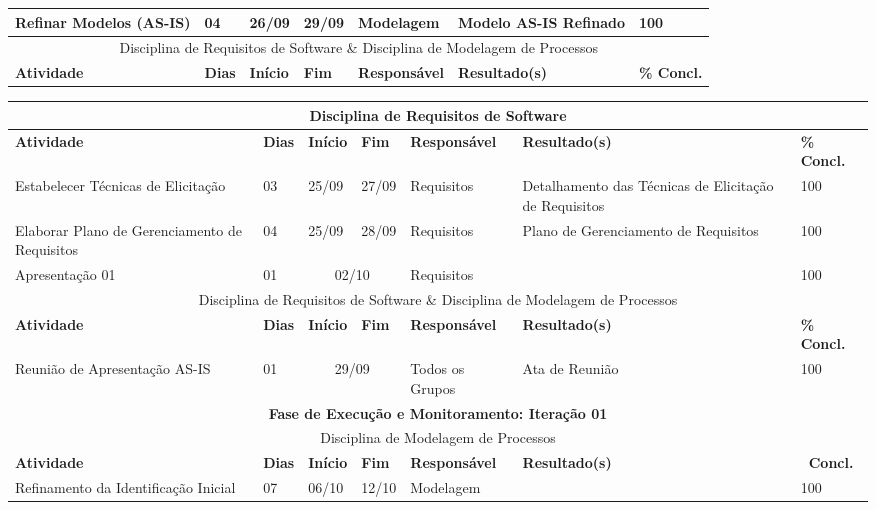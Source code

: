 \begin{landscape}
\begin{center}
\begin{tabular}{|m{6cm}|m{1cm}|m{1cm}|m{1cm}|m{4cm}|m{6cm}|m{2cm}|}
			Refinar Modelos (AS-IS) & 04 & 26/09 & 29/09 & Modelagem & Modelo AS-IS Refinado & 100 \\ \hline
			\multicolumn{7}{|c|}{Disciplina de Requisitos de Software \& Disciplina de Modelagem de Processos} \\
			\hline
			\textbf{Atividade} & \textbf{Dias} & \textbf{Início} & \textbf{Fim} & \textbf{Responsável} & \textbf{Resultado(s)} & \textbf{\% Concl.} \\ \hline
			\end{tabular}
		\end{center}
		\begin{center}
			\begin{tabular}{|m{6cm}|m{1cm}|m{1cm}|m{1cm}|m{4cm}|m{6cm}|m{2cm}|}
			\hline
			\multicolumn{7}{|c|}{Disciplina de Requisitos de Software} \\
			\hline
			\textbf{Atividade} & \textbf{Dias} & \textbf{Início} & \textbf{Fim} & \textbf{Responsável} & \textbf{Resultado(s)} & \textbf{\% Concl.} \\ \hline
			Estabelecer Técnicas de Elicitação & 03 & 25/09 & 27/09 & Requisitos & Detalhamento das Técnicas de Elicitação de Requisitos & 100 \\ \hline
			Elaborar Plano de Gerenciamento de Requisitos & 04 & 25/09 & 28/09 & Requisitos & Plano de Gerenciamento de Requisitos & 100 \\ \hline
			Apresentação 01 & 01 & \multicolumn{2}{c|}{02/10} & Requisitos & & 100 \\ \hline
			\multicolumn{7}{|c|}{Disciplina de Requisitos de Software \& Disciplina de Modelagem de Processos} \\ \hline
			\textbf{Atividade} & \textbf{Dias} & \textbf{Início} & \textbf{Fim} & \textbf{Responsável} & \textbf{Resultado(s)} & \textbf{\% Concl.} \\ \hline
			Reunião de Apresentação AS-IS & 01 & \multicolumn{2}{c|}{29/09} & Todos os Grupos & Ata de Reunião & 100 \\ \hline
			\multicolumn{7}{|c|}{\textbf{Fase de Execução e Monitoramento: Iteração 01}} \\
			\hline
			\multicolumn{7}{|c|}{Disciplina de Modelagem de Processos} \\
			\hline
			\textbf{Atividade} & \textbf{Dias} & \textbf{Início} & \textbf{Fim} & \textbf{Responsável} & \textbf{Resultado(s)} & \textbf{\ Concl.} \\ \hline
			Refinamento da Identificação Inicial & 07 & 06/10 & 12/10 & Modelagem & & 100 \\ \hline

\end{tabular}
\end{center}
\end{landscape}

